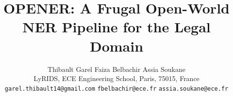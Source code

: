 \documentclass[11pt]{article}
\title{OPENER: A Frugal Open-World NER Pipeline for the Legal Domain}
\author{
  Thibault Garel \quad Faiza Belbachir \quad Assia Soukane \\
  LyRIDS, ECE Engineering School, Paris, 75015, France \\
  \small\texttt{garel.thibault14@gmail.com} \quad
  \small\texttt{fbelbachir@ece.fr} \quad
  \small\texttt{assia.soukane@ece.fr}
}
\begin{document}
\maketitle

\begin{abstract}

\end{abstract}









\appendix

\end{document}
